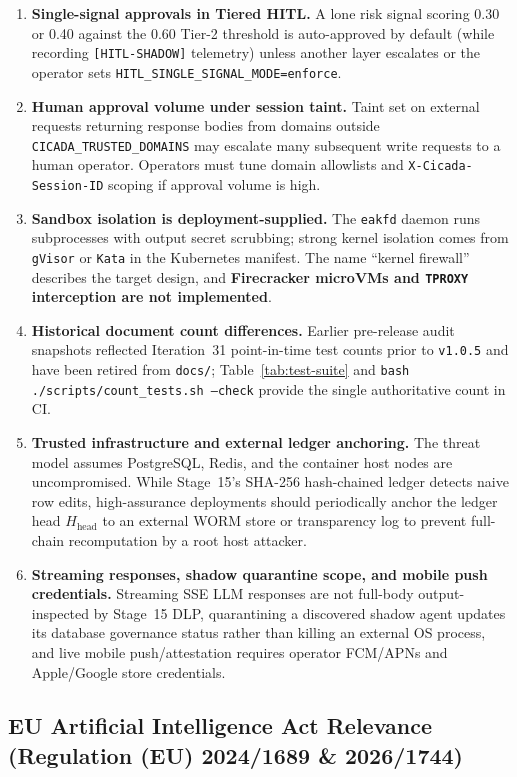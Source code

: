 \documentclass[11pt, a4paper]{article}
\begin{document}
\begin{enumerate}[label=\arabic*., leftmargin=2em]
    \item \textbf{Single-signal approvals in Tiered HITL.} A lone risk signal scoring 0.30 or 0.40 against the 0.60 Tier-2 threshold is auto-approved by default (while recording \texttt{[HITL-SHADOW]} telemetry) unless another layer escalates or the operator sets \texttt{HITL\_SINGLE\_SIGNAL\_MODE=enforce}.
    \item \textbf{Human approval volume under session taint.} Taint set on external requests returning response bodies from domains outside \texttt{CICADA\_TRUSTED\_DOMAINS} may escalate many subsequent write requests to a human operator. Operators must tune domain allowlists and \texttt{X-Cicada-Session-ID} scoping if approval volume is high.
    \item \textbf{Sandbox isolation is deployment-supplied.} The \texttt{eakfd} daemon runs subprocesses with output secret scrubbing; strong kernel isolation comes from \texttt{gVisor} or \texttt{Kata} in the Kubernetes manifest. The name ``kernel firewall'' describes the target design, and \textbf{Firecracker microVMs and \texttt{TPROXY} interception are not implemented}.
    \item \textbf{Historical document count differences.} Earlier pre-release audit snapshots reflected Iteration~31 point-in-time test counts prior to \texttt{v1.0.5} and have been retired from \texttt{docs/}; Table~\ref{tab:test-suite} and \texttt{bash ./scripts/count\_tests.sh --check} provide the single authoritative count in CI.
    \item \textbf{Trusted infrastructure and external ledger anchoring.} The threat model assumes PostgreSQL, Redis, and the container host nodes are uncompromised. While Stage~15's SHA-256 hash-chained ledger detects naive row edits, high-assurance deployments should periodically anchor the ledger head $H_{\text{head}}$ to an external WORM store or transparency log to prevent full-chain recomputation by a root host attacker.
    \item \textbf{Streaming responses, shadow quarantine scope, and mobile push credentials.} Streaming SSE LLM responses are not full-body output-inspected by Stage~15 DLP, quarantining a discovered shadow agent updates its database governance status rather than killing an external OS process, and live mobile push/attestation requires operator FCM/APNs and Apple/Google store credentials.
\end{enumerate}

\subsection{EU Artificial Intelligence Act Relevance (Regulation (EU) 2024/1689 \& 2026/1744)}
\label{subsec:eu-ai-act}
\end{document}
